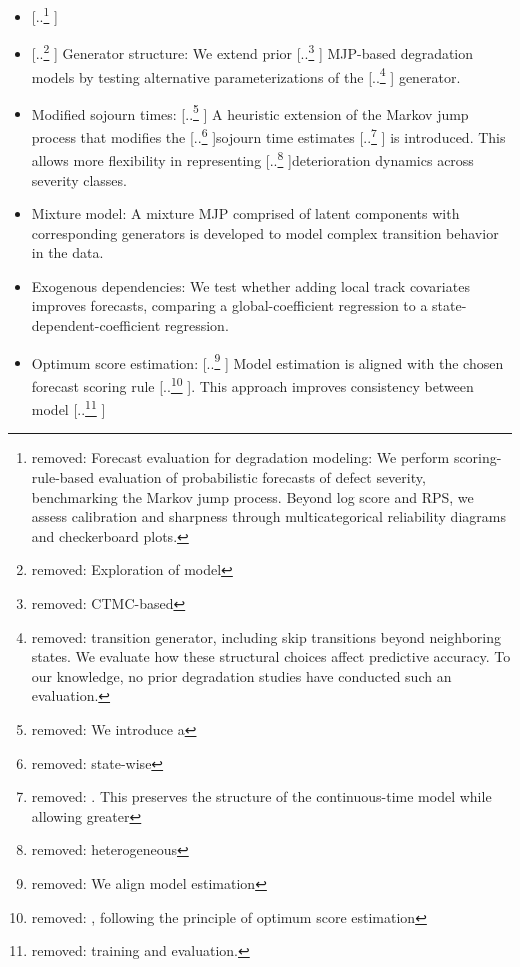 \documentclass{article}
\providecommand{\DIFadd}[1]{{\protect\color{blue} \sf #1}} %
\providecommand{\DIFdel}[1]{{\protect\color{red} [..\footnote{removed: #1} ]}} %
\providecommand{\DIFaddbegin}{} %
\providecommand{\DIFaddend}{} %
\providecommand{\DIFdelbegin}{} %
\providecommand{\DIFdelend}{} %
\begin{document}
\begin{itemize}
    \item \DIFdelbegin \DIFdel{Forecast evaluation for degradation modeling: We perform scoring-rule-based evaluation of probabilistic forecasts of defect severity, benchmarking the Markov jump process. Beyond log score and RPS, we assess calibration and sharpness through multicategorical reliability diagrams and checkerboard plots.
    }%
\item%
\DIFdel{Exploration of model }\DIFdelend \DIFaddbegin \DIFadd{Generator }\DIFaddend structure: We extend prior \DIFdelbegin \DIFdel{CTMC-based }\DIFdelend \DIFaddbegin \DIFadd{MJP-based }\DIFaddend degradation models by testing alternative parameterizations of the \DIFdelbegin \DIFdel{transition generator, including skip transitions beyond neighboring states.    
    We evaluate how these structural choices affect predictive accuracy. To our knowledge, no prior degradation studies have conducted such an evaluation.
    }\DIFdelend \DIFaddbegin \DIFadd{generator.    
    }\DIFaddend \item Modified sojourn times: \DIFdelbegin \DIFdel{We introduce a }\DIFdelend \DIFaddbegin \DIFadd{A }\DIFaddend heuristic extension of the Markov jump process that modifies the \DIFdelbegin \DIFdel{state-wise }\DIFdelend sojourn time estimates \DIFdelbegin \DIFdel{. This preserves the structure of the continuous-time model while allowing greater }\DIFdelend \DIFaddbegin \DIFadd{is introduced. This allows more }\DIFaddend flexibility in representing \DIFdelbegin \DIFdel{heterogeneous }\DIFdelend deterioration dynamics across severity classes.
      \item \DIFaddbegin \DIFadd{Mixture model: A mixture MJP comprised of latent components with corresponding generators is developed to model complex transition behavior in the data.
    }\item \DIFadd{Exogenous dependencies: We test whether adding local track covariates improves forecasts, comparing a global-coefficient regression to a state-dependent-coefficient regression.
     }\item \DIFaddend Optimum score estimation: \DIFdelbegin \DIFdel{We align model estimation }\DIFdelend \DIFaddbegin \DIFadd{Model estimation is aligned }\DIFaddend with the chosen forecast scoring rule\DIFdelbegin \DIFdel{, following the principle of optimum score estimation}\DIFdelend . This approach improves consistency between model \DIFdelbegin \DIFdel{training and evaluation.
}
\end{itemize}
\end{document}
